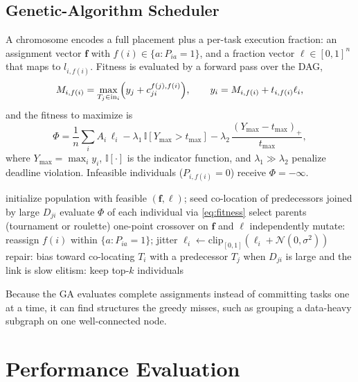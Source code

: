 \documentclass[conference]{IEEEtran}
\begin{document}
\subsection{Genetic-Algorithm Scheduler}
\label{sec:ga}

A chromosome encodes a full placement plus a per-task execution fraction: an assignment vector $\mathbf{f}$ with $f(i)\in\{a:P_{ia}=1\}$, and a fraction vector $\boldsymbol{\ell}\in[0,1]^n$ that maps to $l_{i,f(i)}$. Fitness is evaluated by a forward pass over the DAG,
\begin{equation}
M_{i,f(i)}=\max_{T_j\in \mathrm{in}_i}\Bigl(y_j+c_{ji}^{f(j),f(i)}\Bigr),\qquad
y_i=M_{i,f(i)}+t_{i,f(i)}\ell_i,
\end{equation}
and the fitness to maximize is
\begin{equation}
\Phi=\frac{1}{n}\sum_i A_i\,\ell_i
-\lambda_1\,\mathbb{I}[Y_{\max}>t_{\max}]
-\lambda_2\,\frac{(Y_{\max}-t_{\max})_+}{t_{\max}},
\label{eq:fitness}
\end{equation}
where $Y_{\max}=\max_i y_i$, $\mathbb{I}[\cdot]$ is the indicator function, and $\lambda_1\gg\lambda_2$ penalize deadline violation. Infeasible individuals ($P_{i,f(i)}=0$) receive $\Phi=-\infty$.

\begin{algorithm}[t]
\caption{Genetic Algorithm for Bandwidth/Data-Aware Fog Scheduling}
\label{alg:ga}
\begin{algorithmic}[1]
\STATE initialize population with feasible $(\mathbf{f},\boldsymbol{\ell})$; seed co-location of predecessors joined by large $D_{ji}$
\REPEAT
    \STATE evaluate $\Phi$ of each individual via \eqref{eq:fitness}
    \STATE select parents (tournament or roulette)
    \STATE one-point crossover on $\mathbf{f}$ and $\boldsymbol{\ell}$ independently
    \STATE mutate: reassign $f(i)$ within $\{a:P_{ia}=1\}$; jitter $\ell_i\leftarrow\mathrm{clip}_{[0,1]}(\ell_i+\mathcal{N}(0,\sigma^2))$
    \STATE repair: bias toward co-locating $T_i$ with a predecessor $T_j$ when $D_{ji}$ is large and the link is slow
    \STATE elitism: keep top-$k$ individuals
\end{algorithmic}
\end{algorithm}

Because the GA evaluates complete assignments instead of committing tasks one at a time, it can find structures the greedy misses, such as grouping a data-heavy subgraph on one well-connected node.

\section{Performance Evaluation}
\label{sec:evaluation}
\end{document}

